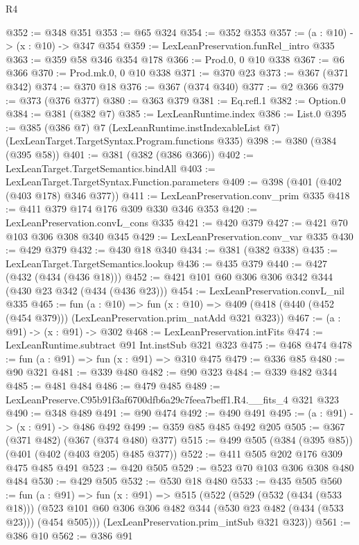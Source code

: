 \begin{lexlean}{R4}
\begin{coremodule}
@352 := @348 @351
@353 := @65 @324
@354 := @352 @353
@357 := (a : @10) -> (x : @10) -> @347 @354
@359 := LexLeanPreservation.funRel_intro @335
@363 := @359 @58 @346 @354 @178
@366 := Prod.{0, 0} @10 @338
@367 := @6 @366
@370 := Prod.mk.{0, 0} @10 @338
@371 := @370 @23
@373 := @367 (@371 @342)
@374 := @370 @18
@376 := @367 (@374 @340)
@377 := @2 @366
@379 := @373 (@376 @377)
@380 := @363 @379
@381 := Eq.refl.{1}
@382 := Option.{0}
@384 := @381 (@382 @7)
@385 := LexLeanRuntime.index
@386 := List.{0}
@395 := @385
    (@386 @7)
    @7
    (LexLeanRuntime.instIndexableList @7)
    (LexLeanTarget.TargetSyntax.Program.functions @335)
@398 := @380 (@384 (@395 @58))
@401 := @381 (@382 (@386 @366))
@402 := LexLeanTarget.TargetSemantics.bindAll
@403 := LexLeanTarget.TargetSyntax.Function.parameters
@409 := @398 (@401 (@402 (@403 @178) @346 @377))
@411 := LexLeanPreservation.conv_prim @335
@418 := @411 @379 @174 @176 @309 @330 @346 @353
@420 := LexLeanPreservation.convL_cons @335
@421 := @420 @379
@427 := @421 @70 @103 @306 @308 @340 @345
@429 := LexLeanPreservation.conv_var @335
@430 := @429 @379
@432 := @430 @18 @340
@434 := @381 (@382 @338)
@435 := LexLeanTarget.TargetSemantics.lookup
@436 := @435 @379
@440 := @427 (@432 (@434 (@436 @18)))
@452 := @421 @101 @60 @306 @306 @342 @344 (@430 @23 @342 (@434 (@436 @23)))
@454 := LexLeanPreservation.convL_nil @335
@465 := fun (a : @10) =>
  fun (x : @10) => @409 (@418 (@440 (@452 (@454 @379))) (LexLeanPreservation.prim_natAdd @321 @323))
@467 := (a : @91) -> (x : @91) -> @302
@468 := LexLeanPreservation.intFits
@474 := LexLeanRuntime.subtract @91 Int.instSub @321 @323
@475 := @468 @474
@478 := fun (a : @91) => fun (x : @91) => @310 @475
@479 := @336 @85
@480 := @90 @321
@481 := @339 @480
@482 := @90 @323
@484 := @339 @482 @344
@485 := @481 @484
@486 := @479 @485
@489 := LexLeanPreserve.C95b91f3af6700dfb6a29c7feea7beff1.R4.__fits_4 @321 @323
@490 := @348 @489
@491 := @90 @474
@492 := @490 @491
@495 := (a : @91) -> (x : @91) -> @486 @492
@499 := @359 @85 @485 @492 @205
@505 := @367 (@371 @482) (@367 (@374 @480) @377)
@515 := @499 @505 (@384 (@395 @85)) (@401 (@402 (@403 @205) @485 @377))
@522 := @411 @505 @202 @176 @309 @475 @485 @491
@523 := @420 @505
@529 := @523 @70 @103 @306 @308 @480 @484
@530 := @429 @505
@532 := @530 @18 @480
@533 := @435 @505
@560 := fun (a : @91) =>
  fun (x : @91) =>
  @515
    (@522
      (@529
        (@532 (@434 (@533 @18)))
        (@523 @101 @60 @306 @306 @482 @344 (@530 @23 @482 (@434 (@533 @23))) (@454 @505)))
      (LexLeanPreservation.prim_intSub @321 @323))
@561 := @386 @10
@562 := @386 @91

\end{coremodule}
\end{lexlean}
